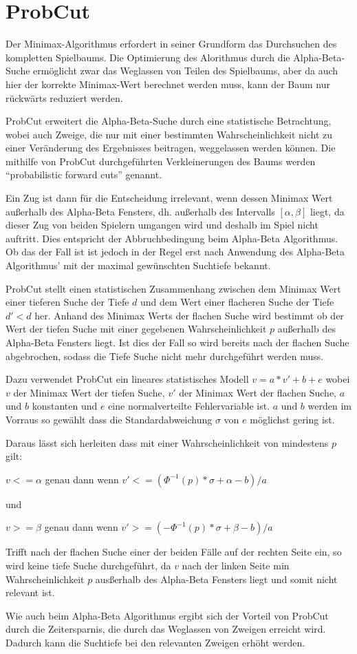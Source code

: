 \section{ProbCut}

Der Minimax-Algorithmus erfordert in seiner Grundform das Durchsuchen des kompletten Spielbaums.
Die Optimierung des Alorithmus durch die Alpha-Beta-Suche ermöglicht zwar das Weglassen von Teilen des Spielbaums, aber da auch hier der korrekte Minimax-Wert berechnet werden muss, kann der Baum nur rückwärts reduziert werden.

ProbCut erweitert die Alpha-Beta-Suche durch eine statistische Betrachtung, wobei auch Zweige, die nur mit einer bestimmten Wahrscheinlichkeit nicht zu einer Veränderung des Ergebnisses beitragen, weggelassen werden können.
Die mithilfe von ProbCut durchgeführten Verkleinerungen des Baums werden "`probabilistic forward cuts"' genannt.

Ein Zug ist dann für die Entscheidung irrelevant, wenn dessen Minimax Wert außerhalb des Alpha-Beta Fensters, dh. außerhalb des Intervalls \([\alpha,\beta]\) liegt, da dieser Zug von beiden Spielern umgangen wird und deshalb im Spiel nicht auftritt.
Dies entspricht der Abbruchbedingung beim Alpha-Beta Algorithmus.
Ob das der Fall ist ist jedoch in der Regel erst nach Anwendung des Alpha-Beta Algorithmus' mit der maximal gewünschten Suchtiefe bekannt.

ProbCut stellt einen statistischen Zusammenhang zwischen dem Minimax Wert einer tieferen Suche der Tiefe \(d\) und dem Wert einer flacheren Suche der Tiefe \(d'<d\) her.
Anhand des Minimax Werts der flachen Suche wird bestimmt ob der Wert der tiefen Suche mit einer gegebenen Wahrscheinlichkeit \(p\) außerhalb des Alpha-Beta Fensters liegt.
Ist dies der Fall so wird bereits nach der flachen Suche abgebrochen, sodass die Tiefe Suche nicht mehr durchgeführt werden muss.

Dazu verwendet ProbCut ein lineares statistisches Modell \(v=a*v'+b+e\) wobei \(v\) der Minimax Wert der tiefen Suche, \(v'\) der Minimax Wert der flachen Suche, \(a\) und \(b\) konstanten und \(e\) eine normalverteilte Fehlervariable ist.
\(a\) und \(b\) werden im Vorraus so gewählt dass die Standardabweichung \(\sigma\) von \(e\) möglichst gering ist.

Daraus lässt sich herleiten dass mit einer Wahrscheinlichkeit von mindestens \(p\) gilt:

\(v<=\alpha\) genau dann wenn \(v'<=(\Phi^{-1}(p)*\sigma+\alpha-b)/a\)

und

\(v>=\beta\) genau dann wenn \(v'>=(-\Phi^{-1}(p)*\sigma+\beta-b)/a\)

Trifft nach der flachen Suche einer der beiden Fälle auf der rechten Seite ein, so wird keine tiefe Suche durchgeführt, da \(v\) nach der linken Seite min Wahrscheinlichkeit \(p\) ausßerhalb des Alpha-Beta Fensters liegt
und somit nicht relevant ist.

Wie auch beim Alpha-Beta Algorithmus ergibt sich der Vorteil von ProbCut durch die Zeitersparnis, die durch das Weglassen von Zweigen erreicht wird. Dadurch kann die Suchtiefe bei den relevanten Zweigen erhöht werden.
\cite[S.~1]{probcut}
